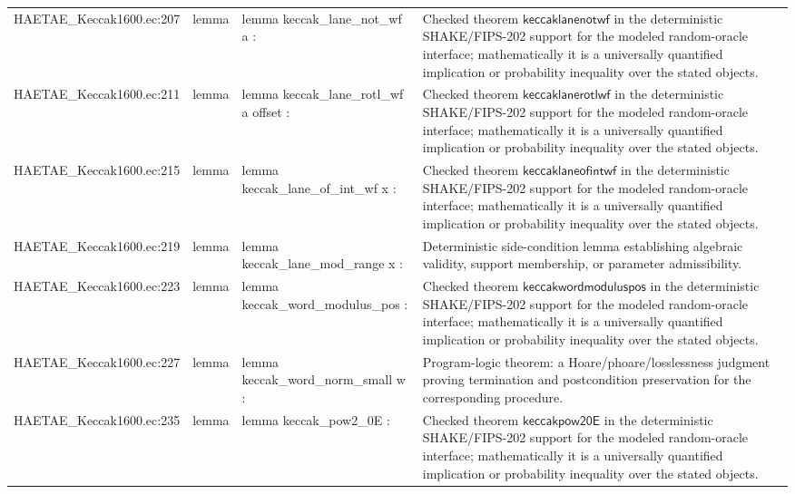 \documentclass[10pt]{article}
\begin{document}
\begin{longtable}{L{0.11\textwidth}L{0.055\textwidth}L{0.385\textwidth}L{0.41\textwidth}}
HAETAE\_\allowbreak{}Keccak1600.\allowbreak{}ec:\allowbreak{}207 & lemma & {\ttfamily\scriptsize lemma keccak\_\allowbreak{}lane\_\allowbreak{}not\_\allowbreak{}wf a :} & Checked theorem $\mathsf{keccaklanenotwf}$ in the deterministic SHAKE/FIPS-202 support for the modeled random-oracle interface; mathematically it is a universally quantified implication or probability inequality over the stated objects. \\
HAETAE\_\allowbreak{}Keccak1600.\allowbreak{}ec:\allowbreak{}211 & lemma & {\ttfamily\scriptsize lemma keccak\_\allowbreak{}lane\_\allowbreak{}rotl\_\allowbreak{}wf a offset :} & Checked theorem $\mathsf{keccaklanerotlwf}$ in the deterministic SHAKE/FIPS-202 support for the modeled random-oracle interface; mathematically it is a universally quantified implication or probability inequality over the stated objects. \\
HAETAE\_\allowbreak{}Keccak1600.\allowbreak{}ec:\allowbreak{}215 & lemma & {\ttfamily\scriptsize lemma keccak\_\allowbreak{}lane\_\allowbreak{}of\_\allowbreak{}int\_\allowbreak{}wf x :} & Checked theorem $\mathsf{keccaklaneofintwf}$ in the deterministic SHAKE/FIPS-202 support for the modeled random-oracle interface; mathematically it is a universally quantified implication or probability inequality over the stated objects. \\
HAETAE\_\allowbreak{}Keccak1600.\allowbreak{}ec:\allowbreak{}219 & lemma & {\ttfamily\scriptsize lemma keccak\_\allowbreak{}lane\_\allowbreak{}mod\_\allowbreak{}range x :} & Deterministic side-condition lemma establishing algebraic validity, support membership, or parameter admissibility. \\
HAETAE\_\allowbreak{}Keccak1600.\allowbreak{}ec:\allowbreak{}223 & lemma & {\ttfamily\scriptsize lemma keccak\_\allowbreak{}word\_\allowbreak{}modulus\_\allowbreak{}pos :} & Checked theorem $\mathsf{keccakwordmoduluspos}$ in the deterministic SHAKE/FIPS-202 support for the modeled random-oracle interface; mathematically it is a universally quantified implication or probability inequality over the stated objects. \\
HAETAE\_\allowbreak{}Keccak1600.\allowbreak{}ec:\allowbreak{}227 & lemma & {\ttfamily\scriptsize lemma keccak\_\allowbreak{}word\_\allowbreak{}norm\_\allowbreak{}small w :} & Program-logic theorem: a Hoare/phoare/losslessness judgment proving termination and postcondition preservation for the corresponding procedure. \\
HAETAE\_\allowbreak{}Keccak1600.\allowbreak{}ec:\allowbreak{}235 & lemma & {\ttfamily\scriptsize lemma keccak\_\allowbreak{}pow2\_\allowbreak{}0E :} & Checked theorem $\mathsf{keccakpow20E}$ in the deterministic SHAKE/FIPS-202 support for the modeled random-oracle interface; mathematically it is a universally quantified implication or probability inequality over the stated objects. \\

\end{longtable}
\end{document}
